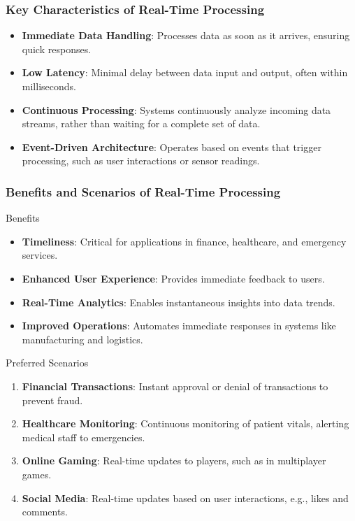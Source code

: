 \documentclass[aspectratio=169]{beamer}
\begin{document}
\begin{frame}[fragile]
    \frametitle{Key Characteristics of Real-Time Processing}
    \begin{itemize}
        \item \textbf{Immediate Data Handling}: Processes data as soon as it arrives, ensuring quick responses.
        \item \textbf{Low Latency}: Minimal delay between data input and output, often within milliseconds.
        \item \textbf{Continuous Processing}: Systems continuously analyze incoming data streams, rather than waiting for a complete set of data.
        \item \textbf{Event-Driven Architecture}: Operates based on events that trigger processing, such as user interactions or sensor readings.
    \end{itemize}
\end{frame}

\begin{frame}[fragile]
    \frametitle{Benefits and Scenarios of Real-Time Processing}
    \begin{block}{Benefits}
        \begin{itemize}
            \item \textbf{Timeliness}: Critical for applications in finance, healthcare, and emergency services.
            \item \textbf{Enhanced User Experience}: Provides immediate feedback to users.
            \item \textbf{Real-Time Analytics}: Enables instantaneous insights into data trends.
            \item \textbf{Improved Operations}: Automates immediate responses in systems like manufacturing and logistics.
        \end{itemize}
    \end{block}
    
    \begin{block}{Preferred Scenarios}
        \begin{enumerate}
            \item \textbf{Financial Transactions}: Instant approval or denial of transactions to prevent fraud.
            \item \textbf{Healthcare Monitoring}: Continuous monitoring of patient vitals, alerting medical staff to emergencies.
            \item \textbf{Online Gaming}: Real-time updates to players, such as in multiplayer games.
            \item \textbf{Social Media}: Real-time updates based on user interactions, e.g., likes and comments.
        \end{enumerate}
    \end{block}
\end{frame}
\end{document}
